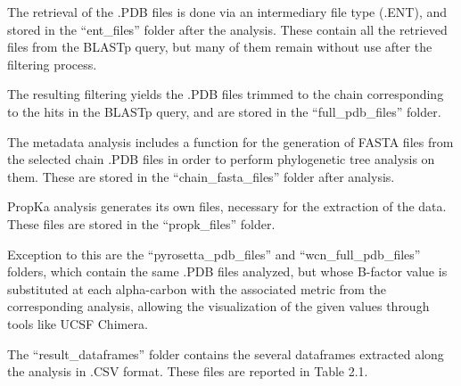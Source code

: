 \documentclass{article}
\begin{document}
The retrieval of the .PDB files is done via an intermediary file type (.ENT), and stored in the “ent\_files” folder after the analysis. These contain all the retrieved files from the BLASTp query, but many of them remain without use after the filtering process.

The resulting filtering yields the .PDB files trimmed to the chain corresponding to the hits in the BLASTp query, and are stored in the “full\_pdb\_files” folder.

The metadata analysis includes a function for the generation of FASTA files from the selected chain .PDB files in order to perform phylogenetic tree analysis on them. These are stored in the “chain\_fasta\_files” folder after analysis.

PropKa analysis generates its own files, necessary for the extraction of the  data. These files are stored in the “propk\_files” folder.

Exception to this are the “pyrosetta\_pdb\_files” and “wcn\_full\_pdb\_files” folders, which contain the same .PDB files analyzed, but whose B-factor value is substituted at each alpha-carbon with the associated metric from the corresponding analysis, allowing the visualization of the given values through tools like UCSF Chimera.

The “result\_dataframes” folder contains the several dataframes extracted along the analysis in .CSV format. These files are reported in Table 2.1.
\end{document}

